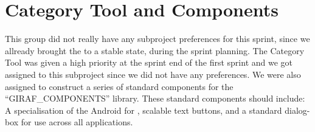 \section{Category Tool and Components}

This group did not really have any subproject preferences for this sprint, since we allready brought the \launcher to a stable state, during the sprint planning. The \giraf Category Tool was given a high priority at the sprint end of the first sprint and we got assigned to this subproject since we did not have any preferences. We were also assigned to construct a series of standard components for the ``GIRAF_COMPONENTS'' library. These standard components should include: A specialisation of the Android  for \giraf, scalable text buttons, and a standard dialog-box for use across all applications. 